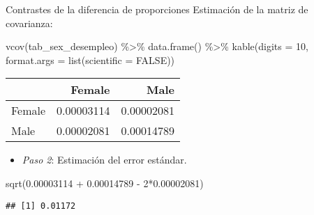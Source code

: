 \documentclass[
  ignorenonframetext,
]{beamer}
\newenvironment{Shaded}{\begin{snugshade}}{\end{snugshade}}
\newcommand{\AttributeTok}[1]{\textcolor[rgb]{0.77,0.63,0.00}{#1}}
\newcommand{\ConstantTok}[1]{\textcolor[rgb]{0.00,0.00,0.00}{#1}}
\newcommand{\DecValTok}[1]{\textcolor[rgb]{0.00,0.00,0.81}{#1}}
\newcommand{\FloatTok}[1]{\textcolor[rgb]{0.00,0.00,0.81}{#1}}
\newcommand{\FunctionTok}[1]{\textcolor[rgb]{0.00,0.00,0.00}{#1}}
\newcommand{\NormalTok}[1]{#1}
\newcommand{\SpecialCharTok}[1]{\textcolor[rgb]{0.00,0.00,0.00}{#1}}
\providecommand{\tightlist}{%
  \setlength{\itemsep}{0pt}\setlength{\parskip}{0pt}}
\begin{document}
\begin{frame}[fragile]{Contrastes de la diferencia de proporciones}
\protect\hypertarget{contrastes-de-la-diferencia-de-proporciones-2}{}
Estimación de la matriz de covarianza:

\begin{Shaded}
\begin{Highlighting}[]
\FunctionTok{vcov}\NormalTok{(tab\_sex\_desempleo) }\SpecialCharTok{\%\textgreater{}\%} \FunctionTok{data.frame}\NormalTok{() }\SpecialCharTok{\%\textgreater{}\%} 
  \FunctionTok{kable}\NormalTok{(}\AttributeTok{digits =} \DecValTok{10}\NormalTok{,}
        \AttributeTok{format.args =} \FunctionTok{list}\NormalTok{(}\AttributeTok{scientific =} \ConstantTok{FALSE}\NormalTok{))}
\end{Highlighting}
\end{Shaded}

\begin{tabular}{l|r|r}
\hline
  & Female & Male\\
\hline
Female & 0.00003114 & 0.00002081\\
\hline
Male & 0.00002081 & 0.00014789\\
\hline
\end{tabular}

\begin{itemize}[<+->]
\tightlist
\item
  \emph{Paso 2}: Estimación del error estándar.
\end{itemize}

\begin{Shaded}
\begin{Highlighting}[]
\FunctionTok{sqrt}\NormalTok{(}\FloatTok{0.00003114}  \SpecialCharTok{+} \FloatTok{0.00014789} \SpecialCharTok{{-}} \DecValTok{2}\SpecialCharTok{*}\FloatTok{0.00002081}\NormalTok{)}
\end{Highlighting}
\end{Shaded}

\begin{verbatim}
## [1] 0.01172
\end{verbatim}
\end{frame}
\end{document}
